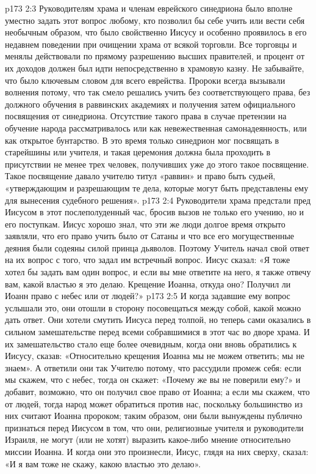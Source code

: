 \vs p173 2:3 Руководителям храма и членам еврейского синедриона было вполне уместно задать этот вопрос любому, кто позволил бы себе учить или вести себя необычным образом, что было свойственно Иисусу и особенно проявилось в его недавнем поведении при очищении храма от всякой торговли. Все торговцы и менялы действовали по прямому разрешению высших правителей, и процент от их доходов должен был идти непосредственно в храмовую казну. Не забывайте, что  было ключевым словом для всего еврейства. Пророки всегда вызывали волнения потому, что так смело решались учить без соответствующего права, без должного обучения в раввинских академиях и получения затем официального посвящения от синедриона. Отсутствие такого права в случае претензии на обучение народа рассматривалось или как невежественная самонадеянность, или как открытое бунтарство. В это время только синедрион мог посвящать в старейшины или учителя, и такая церемония должна была проходить в присутствии не менее трех человек, получивших уже до этого такое посвящение. Такое посвящение давало учителю титул «раввин» и право быть судьей, «утверждающим и разрешающим те дела, которые могут быть представлены ему для вынесения судебного решения».
\vs p173 2:4 Руководители храма предстали пред Иисусом в этот послеполуденный час, бросив вызов не только его учению, но и его поступкам. Иисус хорошо знал, что эти же люди долгое время открыто заявляли, что его право учить было от Сатаны и что все его могущественные деяния были содеяны силой принца дьяволов. Поэтому Учитель начал свой ответ на их вопрос с того, что задал им встречный вопрос. Иисус сказал: «Я тоже хотел бы задать вам один вопрос, и если вы мне ответите на него, я также отвечу вам, какой властью я это делаю. Крещение Иоанна, откуда оно? Получил ли Иоанн право с небес или от людей?»
\vs p173 2:5 И когда задавшие ему вопрос услышали это, они отошли в сторону посовещаться между собой, какой можно дать ответ. Они хотели смутить Иисуса перед толпой, но теперь сами оказались в сильном замешательстве перед всеми собравшимися в этот час во дворе храма. И их замешательство стало еще более очевидным, когда они вновь обратились к Иисусу, сказав: «Относительно крещения Иоанна мы не можем ответить; мы не знаем». А ответили они так Учителю потому, что рассудили промеж себя: если мы скажем, что с небес, тогда он скажет: «Почему же вы не поверили ему?» и добавит, возможно, что он получил свое право от Иоанна; а если мы скажем, что от людей, тогда народ может обратиться против нас, поскольку большинство из них считают Иоанна пророком; таким образом, они были вынуждены публично признаться перед Иисусом в том, что они, религиозные учителя и руководители Израиля, не могут (или не хотят) выразить какое\hyp{}либо мнение относительно миссии Иоанна. И когда они это произнесли, Иисус, глядя на них сверху, сказал: «И я вам тоже не скажу, какою властью это делаю».

